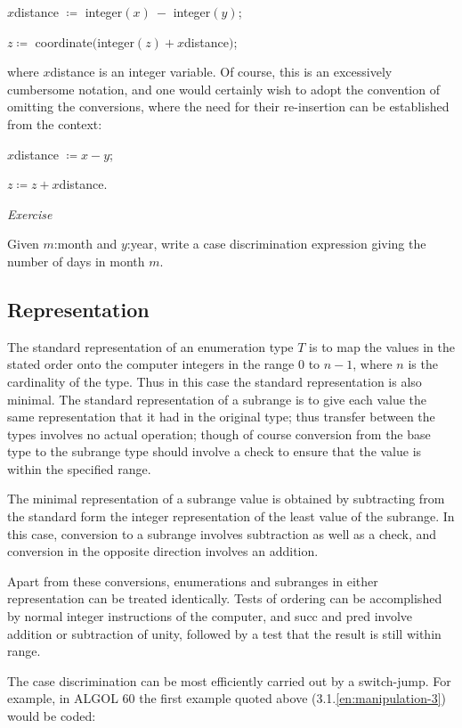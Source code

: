 \documentclass[twoside,11pt]{book}
\begin{document}
\begin{enumerate}[wide, nosep, label=(\arabic*)]
	\quad $x$distance $\coloneq$ integer$(x)\ -$ integer$(y)$;
	
	\quad $z \coloneq$ coordinate$($integer$(z) + x$distance$)$;
	
	\noindent
	where $x$distance is an integer variable. Of course, this is an excessively cumbersome notation, and one would certainly wish to adopt the convention of omitting the conversions, where the need for their re-insertion can be established from the context:
	
	$x$distance $\coloneq x - y$;
	
	$z \coloneq z + x$distance.
\end{enumerate}

\noindent
\textit{Exercise}

\noindent
Given $m$:month and $y$:year, write a case discrimination expression giving the number of days in month $m$.

\subsection{Representation}

The standard representation of an enumeration type $T$ is to map the values in the stated order onto the computer integers in the range 0 to $n - 1$, where $n$ is the cardinality of the type. Thus in this case the standard representation is also minimal. The standard representation of a subrange is to give each value the same representation that it had in the original type; thus transfer between the types involves no actual operation; though of course conversion from the base type to the subrange type should involve a check to ensure that the value is within the specified range.

The minimal representation of a subrange value is obtained by subtracting from the standard form the integer representation of the least value of the subrange. In this case, conversion to a subrange involves subtraction as well as a check, and conversion in the opposite direction involves an addition.

Apart from these conversions, enumerations and subranges in either representation can be treated identically. Tests of ordering can be accomplished by normal integer instructions of the computer, and succ and pred involve addition or subtraction of unity, followed by a test that the result is still within range.

The case discrimination can be most efficiently carried out by a switch-jump. For example, in ALGOL 60 the first example quoted above (3.1.\ref{en:manipulation-3}) would be coded:
\end{document}
